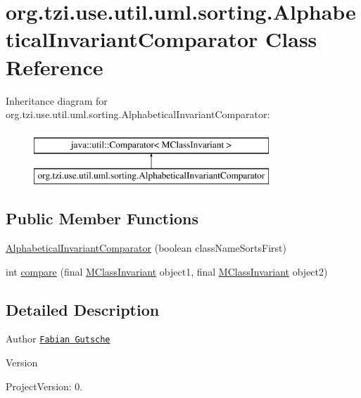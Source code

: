 \hypertarget{classorg_1_1tzi_1_1use_1_1util_1_1uml_1_1sorting_1_1_alphabetical_invariant_comparator}{\section{org.\-tzi.\-use.\-util.\-uml.\-sorting.\-Alphabetical\-Invariant\-Comparator Class Reference}
\label{classorg_1_1tzi_1_1use_1_1util_1_1uml_1_1sorting_1_1_alphabetical_invariant_comparator}
}
Inheritance diagram for org.\-tzi.\-use.\-util.\-uml.\-sorting.\-Alphabetical\-Invariant\-Comparator\-:\begin{figure}[H]
\begin{center}
\leavevmode
\includegraphics[height=2.000000cm]{classorg_1_1tzi_1_1use_1_1util_1_1uml_1_1sorting_1_1_alphabetical_invariant_comparator}
\end{center}
\end{figure}
\subsection*{Public Member Functions}
\begin{DoxyCompactItemize}
\item 
\hyperlink{classorg_1_1tzi_1_1use_1_1util_1_1uml_1_1sorting_1_1_alphabetical_invariant_comparator_ad1d92d3e671d68a1a34a40e9d5b56cc9}{Alphabetical\-Invariant\-Comparator} (boolean class\-Name\-Sorts\-First)
\item 
int \hyperlink{classorg_1_1tzi_1_1use_1_1util_1_1uml_1_1sorting_1_1_alphabetical_invariant_comparator_a23ffd5d87474040d212893f523df27ad}{compare} (final \hyperlink{classorg_1_1tzi_1_1use_1_1uml_1_1mm_1_1_m_class_invariant}{M\-Class\-Invariant} object1, final \hyperlink{classorg_1_1tzi_1_1use_1_1uml_1_1mm_1_1_m_class_invariant}{M\-Class\-Invariant} object2)
\end{DoxyCompactItemize}


\subsection{Detailed Description}
\begin{DoxyAuthor}{Author}
\href{mailto:gutsche@tzi.de}{\tt Fabian Gutsche} 
\end{DoxyAuthor}
\begin{DoxyVersion}{Version}

\end{DoxyVersion}
\begin{DoxyParagraph}{Project\-Version\-:}
0. 
\end{DoxyParagraph}


